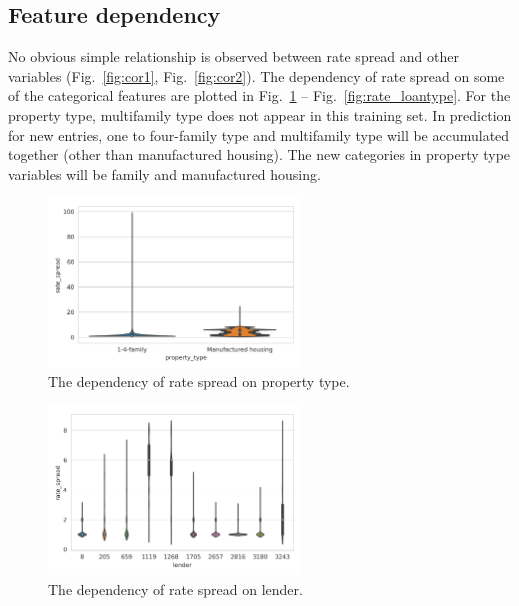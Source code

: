 \documentclass[a4paper,10pt,notitlepage]{article}
\begin{document}
\subsection{Feature dependency}

No obvious simple relationship is observed between rate spread and other variables (Fig.~\ref{fig:cor1}, Fig.~\ref{fig:cor2}).
The dependency of rate spread on some of the categorical features are plotted in Fig.~\ref{fig:rate_propertytype} -- Fig.~\ref{fig:rate_loantype}. For the property type, multifamily type does not appear in this training set. In prediction for new entries, one to four-family type and multifamily type will be accumulated together (other than manufactured housing). The new categories in property type variables will be family and manufactured housing. 




\begin{figure}[H]
\centering
\includegraphics[width=0.6\textwidth]{hmda_violin_property_type.png}
\caption{The dependency of rate spread on property type.}
\label{fig:rate_propertytype}
\end{figure}


\begin{figure}[H]
\centering
\includegraphics[width=0.6\textwidth]{hmda_violin_lender.png}
\caption{The dependency of rate spread on lender.}
\label{fig:rate_lender}
\end{figure}
\end{document}
